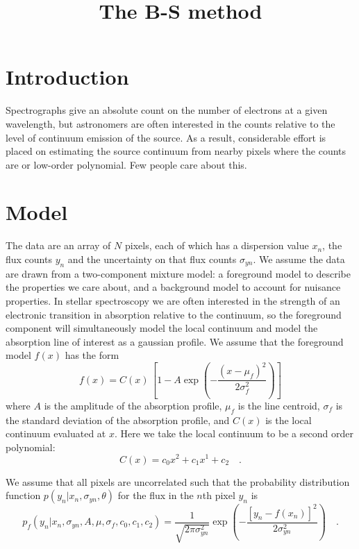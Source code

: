 \documentclass[onecolumn]{aastex62}
\begin{document}
\title{The B-S method}

\correspondingauthor{}
\email{}


\begin{abstract}
\end{abstract}


\section{Introduction} \label{sec:intro}

Spectrographs give an absolute count on the number of electrons at
a given wavelength, but astronomers are often interested in the 
counts relative to the level of continuum emission of the source.
As a result, considerable effort is placed on estimating the source
continuum from nearby pixels where the counts are or low-order
polynomial. Few people care about this.


\section{Model} \label{sec:model}

The data are an array of $N$ pixels, each of which has a
dispersion value $x_{n}$, the flux counts $y_{n}$ and the 
uncertainty on that flux counts $\sigma_{yn}$.
We assume the data are drawn from a two-component mixture model:
a foreground model to describe the properties we care about, and
a background model to account for nuisance properties.
In stellar spectroscopy we are often interested in the strength
of an electronic transition in absorption relative to the continuum,
so the foreground component will simultaneously model the local 
continuum and model the absorption line of interest as a gaussian 
profile. We assume that the foreground model $f(x)$ has the form
\begin{equation}
	f(x) = {C}(x)\,\left[1 - A\exp\left(-\frac{(x - \mu_f)^2}{2\sigma^2_{f}}\right)\right]
\end{equation}
\noindent{}where $A$ is the amplitude of the absorption
profile, $\mu_f$ is the line centroid, $\sigma_f$ is the
standard deviation of the absorption profile, and $C(x)$ is
the local continuum evaluated at $x$. Here we take the local
continuum to be a second order polynomial:
\begin{equation}
	C(x) = c_{0}x^2 + c_{1}x^1 + c_2 \quad .
\end{equation}


We assume that all pixels are uncorrelated such that the
probability distribution function $p\left(y_n|x_n,\sigma_{yn},\theta\right)$
for the flux in the $n$th pixel $y_{n}$ is
\begin{equation}
	p_{f}\left(y_n|x_n,\sigma_{yn},A,\mu,\sigma_f,c_0,c_1,c_2\right) = \frac{1}{\sqrt{2\pi\sigma_{yn}^2}} \exp\left(-\frac{\left[y_{n} - f(x_n)\right]^2}{2\sigma_{yn}^2}\right) \quad .
\end{equation}
\end{document}
